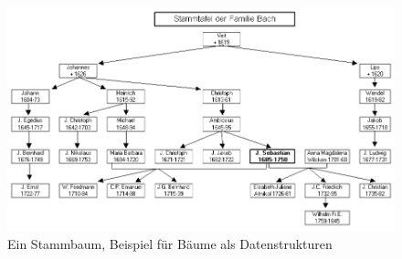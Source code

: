\begin{figure}[h]
    \centering
    \includegraphics[scale=0.7]{abbildungen/Stammbaum.png}
    \caption{Ein Stammbaum, Beispiel für Bäume als Datenstrukturen \cite[]{q4}}
    \label{pic:stammbaum}
\end{figure}
